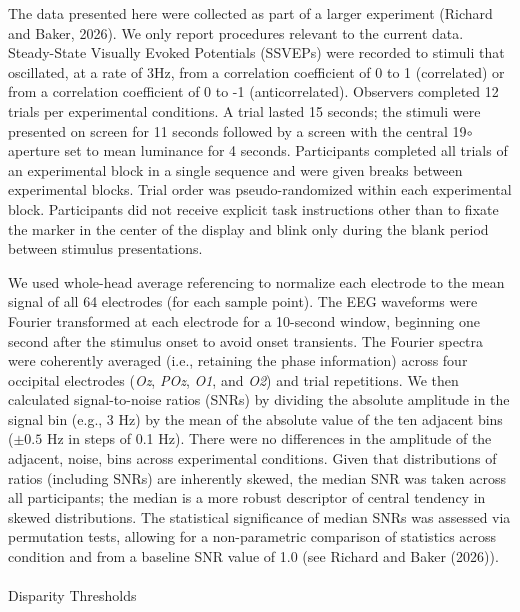 \documentclass[
  12pt,
]{article}
\makeatletter
\let\oldparagraph\paragraph
\renewcommand{\paragraph}{
    \@ifstar
      \xxxParagraphStar
      \xxxParagraphNoStar
  }
\newcommand{\xxxParagraphStar}[1]{\oldparagraph*{#1}\mbox{}}
\newcommand{\xxxParagraphNoStar}[1]{\oldparagraph{#1}\mbox{}}
\makeatother
\begin{document}
The data presented here were collected as part of a larger experiment
(Richard and Baker, 2026). We only report procedures relevant to the
current data. Steady-State Visually Evoked Potentials (SSVEPs) were
recorded to stimuli that oscillated, at a rate of 3Hz, from a
correlation coefficient of 0 to 1 (correlated) or from a correlation
coefficient of 0 to -1 (anticorrelated). Observers completed 12 trials
per experimental conditions. A trial lasted 15 seconds; the stimuli were
presented on screen for 11 seconds followed by a screen with the central
19\(\circ\) aperture set to mean luminance for 4 seconds. Participants
completed all trials of an experimental block in a single sequence and
were given breaks between experimental blocks. Trial order was
pseudo-randomized within each experimental block. Participants did not
receive explicit task instructions other than to fixate the marker in
the center of the display and blink only during the blank period between
stimulus presentations.

We used whole-head average referencing to normalize each electrode to
the mean signal of all 64 electrodes (for each sample point). The EEG
waveforms were Fourier transformed at each electrode for a 10-second
window, beginning one second after the stimulus onset to avoid onset
transients. The Fourier spectra were coherently averaged (i.e.,
retaining the phase information) across four occipital electrodes
(\emph{Oz}, \emph{POz}, \emph{O1}, and \emph{O2}) and trial repetitions.
We then calculated signal-to-noise ratios (SNRs) by dividing the
absolute amplitude in the signal bin (e.g., 3 Hz) by the mean of the
absolute value of the ten adjacent bins (\(\pm 0.5\) Hz in steps of 0.1
Hz). There were no differences in the amplitude of the adjacent, noise,
bins across experimental conditions. Given that distributions of ratios
(including SNRs) are inherently skewed, the median SNR was taken across
all participants; the median is a more robust descriptor of central
tendency in skewed distributions. The statistical significance of median
SNRs was assessed via permutation tests, allowing for a non-parametric
comparison of statistics across condition and from a baseline SNR value
of 1.0 (see Richard and Baker (2026)).

\paragraph{Disparity Thresholds}\label{disparity-thresholds-1}
\end{document}
